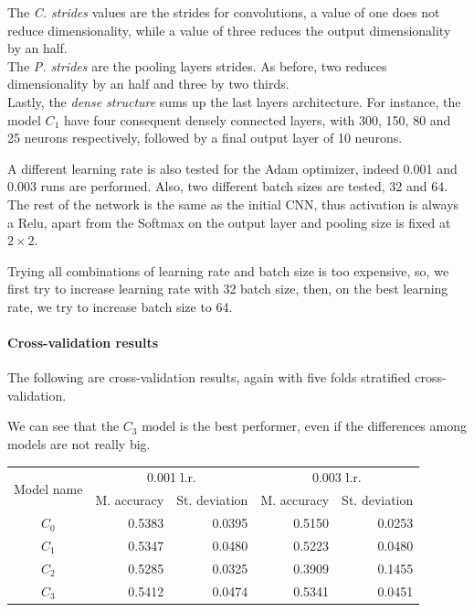 The \emph{C. strides} values are the strides for convolutions, a value of one does not 
reduce dimensionality, while a value of three reduces the output dimensionality by an  half.\\
The \emph{P. strides} are the pooling layers strides. As before, two reduces dimensionality 
by an half and three by two thirds.\\
Lastly, the \emph{dense structure} sums up the last layers architecture. For instance, 
the model $C_1$ have four consequent densely connected layers, with 300, 150, 80 and 
25 neurons respectively, followed by a final output layer of 10 neurons.

A different learning rate is also tested for the Adam optimizer, 
indeed 0.001 and 0.003 runs are performed.
Also, two different batch sizes are tested, 32 and 64.
The rest of the network is the same as the initial CNN, thus activation is always a Relu, 
apart from the Softmax on the output layer and pooling size is fixed at $2 \times 2$. 

Trying all combinations of learning rate and batch size is too expensive, so, 
we first try to increase learning rate with 32 batch size, then, on the best learning rate, 
we try to increase batch size to 64.

\paragraph{Cross-validation results}
The following are cross-validation results, again with five folds stratified cross-validation.

We can see that the $C_3$ model is the best performer, even if the differences among models are not really big.
\begin{center}
    \begin{tabular}{ |c|r|r|r|r| } 
        \hline
        \multirow{2}{*}{Model name} & \multicolumn{2}{c|}{0.001 l.r.} & \multicolumn{2}{c|}{0.003 l.r.}  \\
        \cline{2-5}
        & M. accuracy & St. deviation & M. accuracy & St. deviation \\
        \hline
        $C_0$ & 0.5383 & 0.0395 & 0.5150 & 0.0253 \\
        $C_1$ & 0.5347 & 0.0480 & 0.5223 & 0.0480 \\
        $C_2$ & 0.5285 & 0.0325 & 0.3909 & 0.1455 \\
        $C_3$ & 0.5412 & 0.0474 & 0.5341 & 0.0451 \\
        \hline
    \end{tabular}
\end{center}

